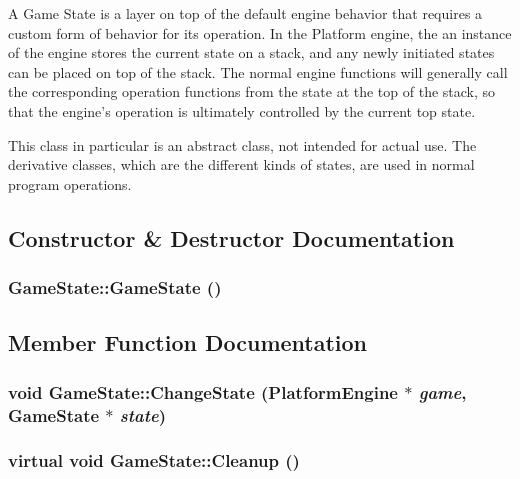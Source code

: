 A Game State is a layer on top of the default engine behavior that requires a custom form of behavior for its operation. In the Platform engine, the an instance of the engine stores the current state on a stack, and any newly initiated states can be placed on top of the stack. The normal engine functions will generally call the corresponding operation functions from the state at the top of the stack, so that the engine's operation is ultimately controlled by the current top state.

This class in particular is an abstract class, not intended for actual use. The derivative classes, which are the different kinds of states, are used in normal program operations. 

\subsection{Constructor \& Destructor Documentation}
\hypertarget{class_game_state_4fa0a2bf50315c4a35a3890a0adcee5c}{
\subsubsection[{GameState}]{\setlength{\rightskip}{0pt plus 5cm}GameState::GameState ()}}
\label{dd/d87/class_game_state_4fa0a2bf50315c4a35a3890a0adcee5c}




\subsection{Member Function Documentation}
\hypertarget{class_game_state_f786aeb704a22a135dc289bb89fcc452}{
\subsubsection[{ChangeState}]{\setlength{\rightskip}{0pt plus 5cm}void GameState::ChangeState ({\bf PlatformEngine} $\ast$ {\em game}, \/  {\bf GameState} $\ast$ {\em state})}}
\label{dd/d87/class_game_state_f786aeb704a22a135dc289bb89fcc452}


\hypertarget{class_game_state_041e7a5430d71da84745af11abdacd93}{
\subsubsection[{Cleanup}]{\setlength{\rightskip}{0pt plus 5cm}virtual void GameState::Cleanup ()}}
\label{dd/d87/class_game_state_041e7a5430d71da84745af11abdacd93}




